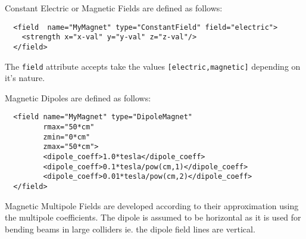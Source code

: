 Constant Electric or Magnetic Fields are defined as follows:
\begin{verbatim}
  <field  name="MyMagnet" type="ConstantField" field="electric">
    <strength x="x-val" y="y-val" z="z-val"/>
  </field>
\end{verbatim}
The {\texttt{field}} attribute accepts take the values {\texttt{[electric,magnetic]}} depending on it's nature.

Magnetic Dipoles are defined as follows:
\begin{verbatim}
  <field name="MyMagnet" type="DipoleMagnet"
         rmax="50*cm"
         zmin="0*cm"
         zmax="50*cm">
         <dipole_coeff>1.0*tesla</dipole_coeff>
         <dipole_coeff>0.1*tesla/pow(cm,1)</dipole_coeff>
         <dipole_coeff>0.01*tesla/pow(cm,2)</dipole_coeff>
  </field>
\end{verbatim}

Magnetic Multipole Fields are developed according to their  approximation using the multipole coefficients. The dipole is assumed to be horizontal as it is used for bending beams in large colliders
ie. the dipole field lines are vertical.

